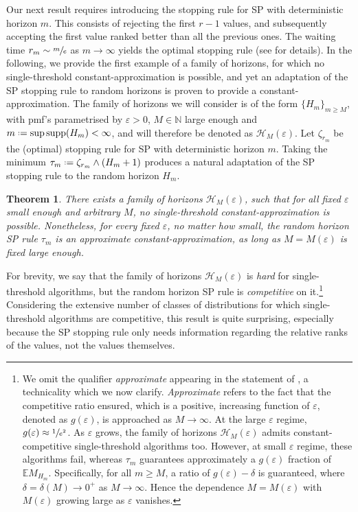 \documentclass[11pt, a4paper, twoside]{article}
\newcommand*{\defeq}{\mathrel{\vcenter{\baselineskip0.5ex \lineskiplimit0pt
			\hbox{\scriptsize.}\hbox{\scriptsize.}}}=}
\newcommand{\eps}{\varepsilon}
\newcommand{\NN}{\mathbb{N}}
\newcommand{\EE}{\mathbb{E}}
\newtheorem{theorem}{Theorem}[section]
\numberwithin{equation}{section}
\begin{document}
	Our next result requires introducing the stopping rule for SP with deterministic horizon $m$. This consists of rejecting the first $r-1$ values, and subsequently accepting the first value ranked better than all the previous ones. The waiting time $r_m\sim\sfrac{m}{e}$ as $m\longrightarrow\infty$ yields the optimal stopping rule (see  for details). In the following, we provide the first example of a family of horizons, for which no single-threshold constant-approximation is possible, and yet an adaptation of the SP stopping rule to random horizons is proven to provide a constant-approximation. The family of horizons we will consider is of the form $\{H_m\}_{m\ge M}$, with pmf's parametrised by $\eps>0$, $M\in\NN$ large enough and $m\defeq \sup\supp(H_m)<\infty$, and will therefore be denoted as $\mathcal{H}_M(\eps)$. Let $\zeta_{r_m}$ be the (optimal) stopping rule for SP with deterministic horizon $m$. Taking the minimum $\tau_m\defeq\zeta_{r_m}\wedge(H_m+1)$ produces a natural adaptation of the SP stopping rule to the random horizon $H_m$.
	\begin{theorem}\label{future}
		There exists a family of horizons $\mathcal{H}_M(\eps)$, such that for all fixed $\eps$ small enough and arbitrary $M$, no single-threshold constant-approximation is possible. Nonetheless, for every fixed $\eps$, no matter how small, the random horizon SP rule $\tau_m$ is an approximate constant-approximation, as long as $M=M(\eps)$ is fixed large enough.
	\end{theorem}
	For brevity, we say that the family of horizons $\mathcal{H}_M(\eps)$ is \textit{hard} for single-threshold algorithms, but the random horizon SP rule is \textit{competitive} on it.\footnote{We omit the qualifier \textit{approximate} appearing in the statement of ,  a technicality which we now clarify. \textit{Approximate} refers to the fact that the competitive ratio ensured, which is a positive, increasing function of $\eps$, denoted as $g(\eps)$, is approached as $M\longrightarrow\infty$. At the large $\eps$ regime, $g(\eps)\approx\sfrac{1}{e^2}$. As $\eps$ grows, the family of horizons $\mathcal{H}_M(\eps)$ admits constant-competitive single-threshold algorithms too. However, at small $\eps$ regime, these algorithms fail, whereas $\tau_m$ guarantees approximately a $g(\eps)$ fraction of $\EE M_{H_m}$. Specifically, for all $m\ge M$, a ratio of $g(\eps)-\delta$ is guaranteed, where $\delta=\delta(M)\longrightarrow 0^+$ as $M\longrightarrow\infty$. Hence the dependence $M=M(\eps)$ with $M(\eps)$ growing large as $\eps$ vanishes.} Considering the extensive number of classes of distributions for which single-threshold algorithms are competitive, this result is quite surprising, especially because the SP stopping rule only needs information regarding the relative ranks of the values, not the values themselves.
	
\end{document}
